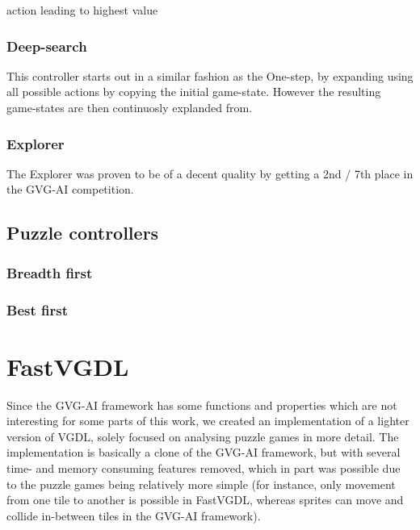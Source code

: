 \documentclass[a4paper,titlepage,final, twoside]{report}
\begin{document}
\begin{algorithm}[H]
\Return action leading to highest value

%
\end{algorithm}

\subsubsection*{Deep-search}
This controller starts out in a similar fashion as the One-step, by expanding using all possible actions by copying the initial game-state.
However the resulting game-states are then continuosly explanded from.

\subsubsection*{Explorer}

The Explorer was proven to be of a decent quality by getting a 2nd / 7th place in the GVG-AI competition.

\subsection{Puzzle controllers}

\subsubsection*{Breadth first}

\subsubsection*{Best first}



\section{FastVGDL}
Since the GVG-AI framework has some functions and properties which are not interesting for some parts of this work, we created an implementation of a lighter version of VGDL, solely focused on analysing puzzle games in more detail.
The implementation is basically a clone of the GVG-AI framework, but with several time- and memory consuming features removed, which in part was possible due to the puzzle games being relatively more simple (for instance, only movement from one tile to another is possible in FastVGDL, whereas sprites can move and collide in-between tiles in the GVG-AI framework).
\end{document}
